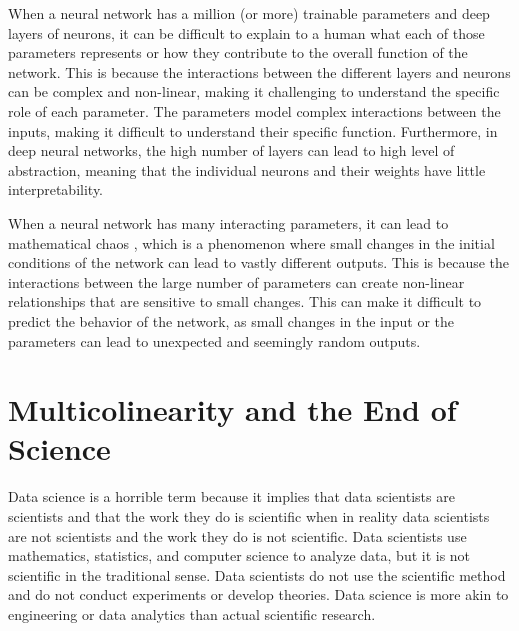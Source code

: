 When a neural network has a million (or more) trainable parameters and deep layers of neurons, it can be difficult to explain to a human what each of those parameters represents or how they contribute to the overall function of the network. This is because the interactions between the different layers and neurons can be complex and non-linear, making it challenging to understand the specific role of each parameter. The parameters  model complex interactions between the inputs, making it difficult to understand their specific function. Furthermore, in deep neural networks, the high number of layers can lead to high level of abstraction, meaning that the individual neurons and their weights have little interpretability.

When a neural network has many interacting parameters, it can lead to mathematical chaos , which is a phenomenon where small changes in the initial conditions of the network can lead to vastly different outputs. This is because the interactions between the large number of parameters can create non-linear relationships that are sensitive to small changes. This can make it difficult to predict the behavior of the network, as small changes in the input or the parameters can lead to unexpected and seemingly random outputs.

\section{Multicolinearity and the End of Science}

Data science is a horrible term because it implies that data scientists are scientists and that the work they do is scientific when in reality data scientists are not scientists and the work they do is not scientific. Data scientists use mathematics, statistics, and computer science to analyze data, but it is not scientific in the traditional sense. Data scientists do not use the scientific method and do not conduct experiments or develop theories. Data science is more akin to engineering or data analytics than actual scientific research.

